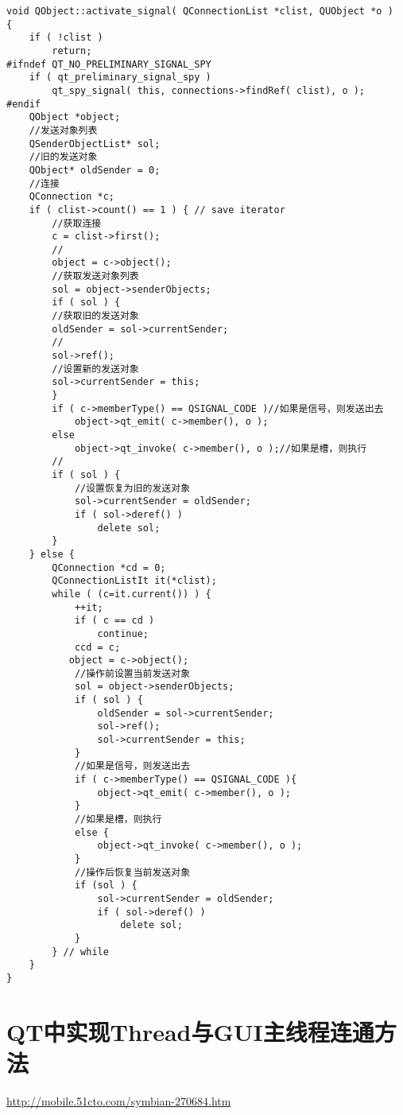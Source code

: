 \documentclass[9pt,b5paper]{article}
\begin{document}
\begin{enumerate}
\begin{lstlisting}
void QObject::activate_signal( QConnectionList *clist, QUObject *o )   {  
    if ( !clist )  
	    return;  
#ifndef QT_NO_PRELIMINARY_SIGNAL_SPY  
    if ( qt_preliminary_signal_spy )  
	    qt_spy_signal( this, connections->findRef( clist), o );  
#endif  
    QObject *object;  
    //发送对象列表  
    QSenderObjectList* sol;  
    //旧的发送对象  
    QObject* oldSender = 0;  
    //连接  
    QConnection *c;  
    if ( clist->count() == 1 ) { // save iterator  
	    //获取连接  
	    c = clist->first();  
	    //  
	    object = c->object();  
	    //获取发送对象列表  
	    sol = object->senderObjects;  
	    if ( sol ) {  
		//获取旧的发送对象  
		oldSender = sol->currentSender;  
		//  
		sol->ref();  
		//设置新的发送对象  
		sol->currentSender = this;  
	    }  
	    if ( c->memberType() == QSIGNAL_CODE )//如果是信号，则发送出去  
		    object->qt_emit( c->member(), o );  
	    else  
		    object->qt_invoke( c->member(), o );//如果是槽，则执行  
	    //       
	    if ( sol ) {  
		    //设置恢复为旧的发送对象  
		    sol->currentSender = oldSender;  
		    if ( sol->deref() )  
			    delete sol;  
	    }  
    } else {  
	    QConnection *cd = 0;  
	    QConnectionListIt it(*clist);  
	    while ( (c=it.current()) ) {  
		    ++it;  
		    if ( c == cd )  
			    continue;  
		    ccd = c;   
		   object = c->object();  
		    //操作前设置当前发送对象  
		    sol = object->senderObjects;  
		    if ( sol ) {  
			    oldSender = sol->currentSender;  
			    sol->ref();  
			    sol->currentSender = this;  
		    }  
		    //如果是信号，则发送出去  
		    if ( c->memberType() == QSIGNAL_CODE ){  
			    object->qt_emit( c->member(), o );  
		    }  
		    //如果是槽，则执行  
		    else {  
			    object->qt_invoke( c->member(), o );  
		    }  
		    //操作后恢复当前发送对象  
		    if (sol ) {  
			    sol->currentSender = oldSender;  
			    if ( sol->deref() )  
				    delete sol;  
		    }  
	    } // while  
    }  
}
\end{lstlisting}
\end{enumerate}

\section{QT中实现Thread与GUI主线程连通方法}
\label{sec-5}
\url{http://mobile.51cto.com/symbian-270684.htm}
\subsection{}
\label{sec-5-1}
\end{document}
